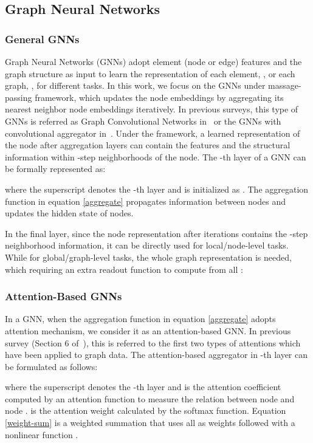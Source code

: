 \documentclass[letterpaper]{article} \usepackage{aaai20}  \usepackage{times}  \usepackage{helvet} \usepackage{courier}  \usepackage[hyphens]{url}  \usepackage{graphicx} \urlstyle{rm} \def\UrlFont{\rm}  \usepackage{graphicx}  \frenchspacing  \setlength{\pdfpagewidth}{8.5in}  \setlength{\pdfpageheight}{11in}
\theoremstyle{plain}
\theoremstyle{definition}
\begin{document}
\subsection{Graph Neural Networks}

\subsubsection{General GNNs} Graph Neural Networks (GNNs) adopt element (node or edge) features  and the graph structure  as input to learn the representation of each element, , or each graph, , for different tasks. In this work, we focus on the GNNs under massage-passing framework, which updates the node embeddings by aggregating its nearest neighbor node embeddings iteratively. In previous surveys, this type of GNNs is referred as Graph Convolutional Networks in~\cite{wu2019comprehensive} or the GNNs with convolutional aggregator in~\cite{zhou2018graph}. Under the framework, a learned representation of the node after  aggregation layers can contain the features and the structural information within -step neighborhoods of the node. The -th layer of a GNN can be formally represented as:

where the superscript  denotes the -th layer and  is initialized as . The aggregation function  in equation \ref{aggregate} propagates information between nodes and updates the hidden state of nodes.

In the final layer, since the node representation  after  iterations contains the -step neighborhood information, it can be directly used for local/node-level tasks. While for global/graph-level tasks, the whole graph representation  is needed, which requiring an extra readout function  to compute  from all :


\subsubsection{Attention-Based GNNs} In a GNN, when the aggregation function  in equation \ref{aggregate} adopts attention mechanism, we consider it as an attention-based GNN. In previous survey (Section 6 of~\cite{lee2018attention}), this is referred to the first two types of attentions which have been applied to graph data. The attention-based aggregator in -th layer can be formulated as follows:

where the superscript  denotes the -th layer and  is the attention coefficient computed by an attention function  to measure the relation between node  and node .  is the attention weight calculated by the softmax function. Equation \ref{weight-sum} is a weighted summation that uses all  as weights followed with a nonlinear function .
\end{document}
